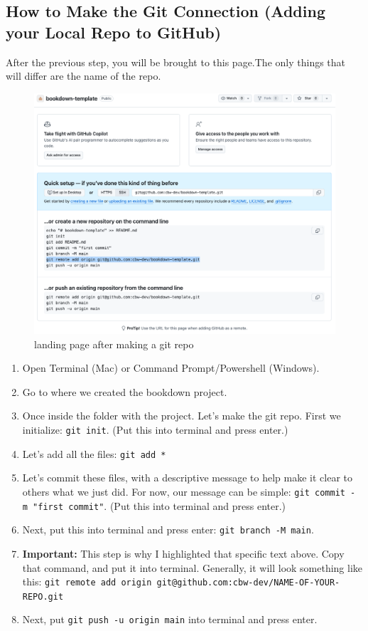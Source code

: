 \documentclass[
]{book}
\theoremstyle{definition}
\theoremstyle{definition}
\theoremstyle{definition}
\theoremstyle{definition}
\theoremstyle{remark}
\begin{document}
\subsection{How to Make the Git Connection (Adding your Local Repo to GitHub)}\label{how-to-make-the-git-connection-adding-your-local-repo-to-github}

After the previous step, you will be brought to this page.The only things that will differ are the name of the repo.

\begin{figure}
\centering
\includegraphics{img/git-instruct/git-connection.png}
\caption{landing page after making a git repo}
\end{figure}

\begin{enumerate}
\def\labelenumi{\arabic{enumi}.}
\setcounter{enumi}{4}
\item
  Open Terminal (Mac) or Command Prompt/Powershell (Windows).
\item
  Go to where we created the bookdown project.
\item
  Once inside the folder with the project. Let's make the git repo. First we initialize: \texttt{git\ init}. (Put this into terminal and press enter.)
\item
  Let's add all the files: \texttt{git\ add\ *}
\item
  Let's commit these files, with a descriptive message to help make it clear to others what we just did. For now, our message can be simple: \texttt{git\ commit\ -m\ "first\ commit"}. (Put this into terminal and press enter.)
\item
  Next, put this into terminal and press enter: \texttt{git\ branch\ -M\ main}.
\item
  \textbf{Important:} This step is why I highlighted that specific text above. Copy that command, and put it into terminal. Generally, it will look something like this: \texttt{git\ remote\ add\ origin\ git@github.com:cbw-dev/NAME-OF-YOUR-REPO.git}
\item
  Next, put \texttt{git\ push\ -u\ origin\ main} into terminal and press enter.
\end{enumerate}
\end{document}
